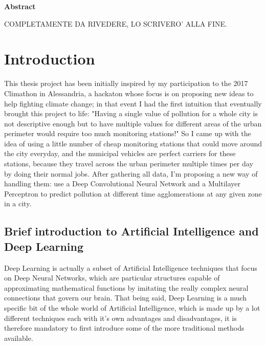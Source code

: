 \documentclass[11pt,a4paper,titlepage]{book}
\begin{document}


\thispagestyle{plain}
\begin{center}
    \textbf{Abstract}
\end{center}
COMPLETAMENTE DA RIVEDERE, LO SCRIVERO' ALLA FINE.
\tableofcontents

\newpage
\thispagestyle{plain}

\chapter{Introduction}
This thesis project has been initially inspired by my participation to the 2017 Climathon in Alessandria, a hackaton whose focus is on proposing new ideas to help fighting climate change; in that event I had the first intuition that eventually brought this project to life: "Having a single value of pollution for a whole city is not descriptive enough but to have multiple values for different areas of the urban perimeter would require too much monitoring stations!"
\newline
So I came up with the idea of using a little number of cheap monitoring stations that could move around the city everyday, and the municipal vehicles are perfect carriers for these stations, because they travel across the urban perimeter multiple times per day by doing their normal jobs. After gathering all data, I'm proposing a new way of handling them: use a Deep Convolutional Neural Network and a Multilayer Perceptron to predict pollution at different time agglomerations at any given zone in a city.

\section{Brief introduction to Artificial Intelligence and Deep Learning}
Deep Learning is actually a subset of Artificial Intelligence techniques that focus on Deep Neural Networks, which are particular structures capable of approximating mathematical functions by imitating the really complex neural connections that govern our brain. That being said, Deep Learning is a much specific bit of the whole world of Artificial Intelligence, which is made up by a lot different techniques each with it's own advantages and disadvantages, it is therefore mandatory to first introduce some of the more traditional methods available.
\end{document}
